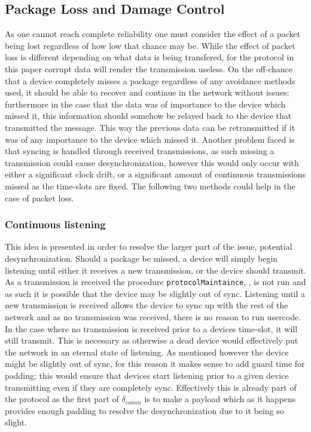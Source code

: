\subsection{Package Loss and Damage Control}
As one cannot reach complete reliability one must consider the effect of a packet being lost regardless of how low that chance may be.
While the effect of packet loss is different depending on what data is being transfered, for the protocol in this paper corrupt data will render the transmission useless.
On the off-chance that a device completely misses a package regardless of any avoidance methods used, it should be able to recover and continue in the network without issues; furthermore in the case that the data was of importance to the device which missed it, this information should somehow be relayed back to the device that transmitted the message.
This way the previous data can be retransmitted if it was of any importance to the device which missed it.
Another problem faced is that syncing is handled through received transmissions, as such missing a transmission could cause desynchronization, however this would only occur with either a significant clock drift, or a significant amount of continuous transmissions missed as the time-slots are fixed.
The following two methods could help in the case of packet loss.

\subsubsection*{Continuous listening}\label{contListen}
This idea is presented in order to resolve the larger part of the issue, potential desynchronization.
Should a package be missed, a device will simply begin listening until either it receives a new transmission, or the device should transmit.
As a transmission is received the procedure \texttt{protocolMaintaince}, , is not run and as such it is possible that the device may be slightly out of sync.
Listening until a new transmission is received allows the device to sync up with the rest of the network and as no transmission was received, there is no reason to run usercode.
In the case where no transmission is received prior to a devices time-slot, it will still transmit.
This is necessary as otherwise a dead device would effectively put the network in an eternal state of listening.
As mentioned however the device might be slightly out of sync, for this reason it makes sense to add guard time for padding; this would ensure that devices start listening prior to a given device transmitting even if they are completely sync.
Effectively this is already part of the protocol as the first part of $\delta_{comm}$ is to make a payload which as it happens provides enough padding to resolve the desynchronization due to it being so slight.

